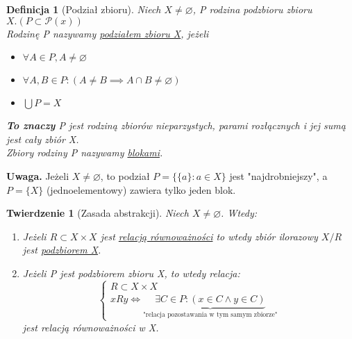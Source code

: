 \documentclass[a5paper,8pt]{article}
\theoremstyle{mythmstyle}
\newtheorem{definition}{Definicja}[section]
\newtheorem{theorem}{Twierdzenie}[section]
\begin{document}
            \begin{definition}[Podział zbioru]
                Niech $ X \neq \varnothing $, P rodzina podzbioru zbioru $ X. (P \subset \mathcal{P}(x)) $\\
                Rodzinę P nazywamy \underline{podziałem zbioru X}, jeżeli

                \begin{itemize}
                    \item $ \forall A \in P, A \neq \varnothing $
                    \item $ \forall A, B \in P : (A \neq B \implies A \cap B \neq \varnothing) $
                    \item $ \bigcup P = X $
                \end{itemize}

                \textbf{To znaczy} P jest rodziną zbiorów nieparzystych, parami rozłącznych
                i jej sumą jest cały zbiór X.\\
                Zbiory rodziny P nazywamy \underline{blokami}.
            \end{definition}

            \textbf{Uwaga.} Jeżeli $ X \neq \varnothing $, to podział $ P = \{ \{ a \} : a \in X \} $
            jest "najdrobniejszy", a $ P = \{ X \} $ (jednoelementowy) zawiera tylko jeden blok.


            \begin{theorem}[Zasada abstrakcji]
                Niech $ X \neq \varnothing $. Wtedy:
                \begin{enumerate}
                    \item Jeżeli $ R \subset X \times X $ jest \underline{relacją równoważności}
                    to wtedy zbiór ilorazowy $ X / R $ jest \underline{podzbiorem X}.
                    \item Jeżeli P jest podzbiorem zbioru X, to wtedy relacja:
                    \begin{equation*}
                        \begin{cases}
                            R \subset X \times X\\
                            x R y \iff \underbrace{\exists C \in P : (x \in C \wedge y \in C)}_
                            \text{"relacja pozostawania w tym samym zbiorze"}
                        \end{cases}
                    \end{equation*}
                jest relacją równoważności w X.
                \end{enumerate}
            \end{theorem}
\end{document}
